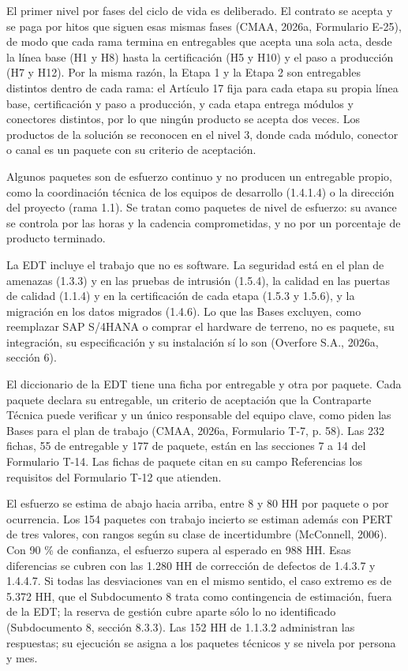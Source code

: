 \documentclass[subdoc]{../../comun/overfore}
\begin{document}
El primer nivel por fases del ciclo de vida es deliberado. El contrato se acepta y se paga por hitos que siguen esas mismas fases (CMAA, 2026a, Formulario E-25), de modo que cada rama termina en entregables que acepta una sola acta, desde la línea base (H1 y H8) hasta la certificación (H5 y H10) y el paso a producción (H7 y H12). Por la misma razón, la Etapa 1 y la Etapa 2 son entregables distintos dentro de cada rama: el Artículo 17 fija para cada etapa su propia línea base, certificación y paso a producción, y cada etapa entrega módulos y conectores distintos, por lo que ningún producto se acepta dos veces. Los productos de la solución se reconocen en el nivel 3, donde cada módulo, conector o canal es un paquete con su criterio de aceptación.

Algunos paquetes son de esfuerzo continuo y no producen un entregable propio, como la coordinación técnica de los equipos de desarrollo (1.4.1.4) o la dirección del proyecto (rama 1.1). Se tratan como paquetes de nivel de esfuerzo: su avance se controla por las horas y la cadencia comprometidas, y no por un porcentaje de producto terminado.

La EDT incluye el trabajo que no es software. La seguridad está en el plan de amenazas (1.3.3) y en las pruebas de intrusión (1.5.4), la calidad en las puertas de calidad (1.1.4) y en la certificación de cada etapa (1.5.3 y 1.5.6), y la migración en los datos migrados (1.4.6). Lo que las Bases excluyen, como reemplazar SAP S/4HANA o comprar el hardware de terreno, no es paquete, su integración, su especificación y su instalación sí lo son (Overfore S.A., 2026a, sección 6).

El diccionario de la EDT tiene una ficha por entregable y otra por paquete. Cada paquete declara su entregable, un criterio de aceptación que la Contraparte Técnica puede verificar y un único responsable del equipo clave, como piden las Bases para el plan de trabajo (CMAA, 2026a, Formulario T-7, p. 58). Las 232 fichas, 55 de entregable y 177 de paquete, están en las secciones 7 a 14 del Formulario T-14. Las fichas de paquete citan en su campo Referencias los requisitos del Formulario T-12 que atienden.

El esfuerzo se estima de abajo hacia arriba, entre 8 y 80 HH por paquete o por ocurrencia. Los 154 paquetes con trabajo incierto se estiman además con PERT de tres valores, con rangos según su clase de incertidumbre (McConnell, 2006). Con 90 \% de confianza, el esfuerzo supera al esperado en 988 HH. Esas diferencias se cubren con las 1.280 HH de corrección de defectos de 1.4.3.7 y 1.4.4.7. Si todas las desviaciones van en el mismo sentido, el caso extremo es de 5.372 HH, que el Subdocumento 8 trata como contingencia de estimación, fuera de la EDT; la reserva de gestión cubre aparte sólo lo no identificado (Subdocumento 8, sección 8.3.3). Las 152 HH de 1.1.3.2 administran las respuestas; su ejecución se asigna a los paquetes técnicos y se nivela por persona y mes.
\end{document}
